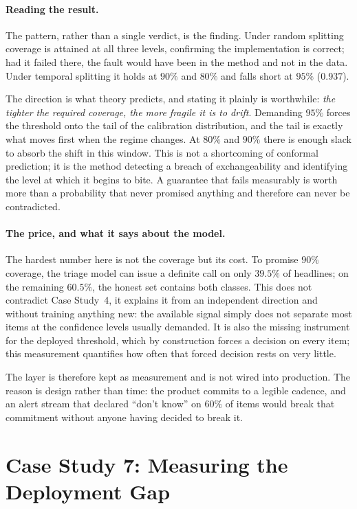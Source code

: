 \paragraph{Reading the result.} The pattern, rather than a single verdict, is the finding. Under
random splitting coverage is attained at all three levels, confirming the implementation is correct;
had it failed there, the fault would have been in the method and not in the data. Under temporal
splitting it holds at $90\%$ and $80\%$ and falls short at $95\%$ ($0.937$).

The direction is what theory predicts, and stating it plainly is worthwhile: \emph{the tighter the
required coverage, the more fragile it is to drift}. Demanding $95\%$ forces the threshold onto the
tail of the calibration distribution, and the tail is exactly what moves first when the regime
changes. At $80\%$ and $90\%$ there is enough slack to absorb the shift in this window. This is not a
shortcoming of conformal prediction; it is the method detecting a breach of exchangeability and
identifying the level at which it begins to bite. A guarantee that fails measurably is worth more
than a probability that never promised anything and therefore can never be contradicted.

\paragraph{The price, and what it says about the model.} The hardest number here is not the coverage
but its cost. To promise $90\%$ coverage, the triage model can issue a definite call on only $39.5\%$
of headlines; on the remaining $60.5\%$, the honest set contains both classes. This does not
contradict Case Study~4, it explains it from an independent direction and without training anything
new: the available signal simply does not separate most items at the confidence levels usually
demanded. It is also the missing instrument for the deployed threshold, which by construction forces
a decision on every item; this measurement quantifies how often that forced decision rests on very
little.

The layer is therefore kept as measurement and is not wired into production. The reason is design
rather than time: the product commits to a legible cadence, and an alert stream that declared ``don't
know'' on $60\%$ of items would break that commitment without anyone having decided to break it.

\section{Case Study 7: Measuring the Deployment Gap}
\label{sec:cs_drift}

